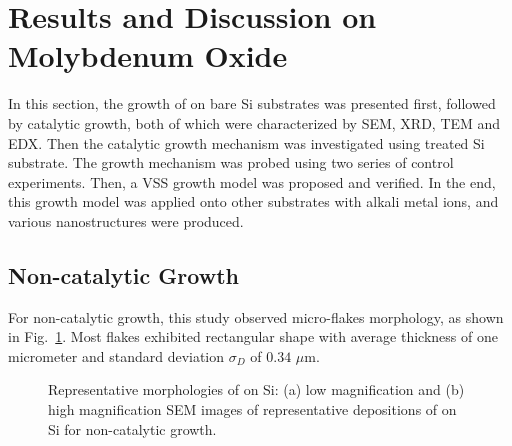 \section{Results and Discussion on Molybdenum Oxide}\label{sec:result}
In this section, the growth of  on bare Si substrates was presented first, followed by catalytic growth, both of which were characterized by SEM, XRD, TEM and EDX. Then the catalytic growth mechanism was investigated using  treated Si substrate. The growth mechanism was probed using two series of control experiments. Then, a VSS growth model was proposed and verified. In the end, this growth model was applied onto other substrates with alkali metal ions, and various  nanostructures were produced.

\subsection{Non-catalytic Growth}\label{sec:nonsi}

For  non-catalytic growth, this study observed micro-flakes morphology, as shown in Fig.~\ref{fig:mosisem}. Most flakes exhibited rectangular shape with average thickness of one micrometer and standard deviation $\sigma_D$ of $0.34$ $\mu$m.
\begin{figure}[htb]
\centering
{}\hspace{0.04\textwidth}
\caption[Representative morphologies of  on Si]{Representative morphologies of  on Si: (a) low magnification and (b) high magnification SEM images of representative depositions of  on Si for non-catalytic growth.}
\label{fig:mosisem}
\end{figure}

